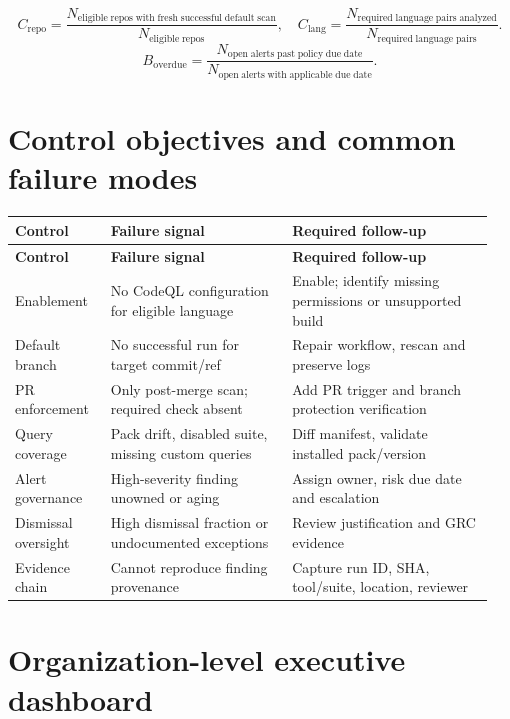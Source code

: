 \documentclass[11pt,letterpaper,oneside]{book}
\begin{document}
\[
C_{\mathrm{repo}}=\frac{N_{\mathrm{eligible\;repos\;with\;fresh\;successful\;default\;scan}}}{N_{\mathrm{eligible\;repos}}},\quad
C_{\mathrm{lang}}=\frac{N_{\mathrm{required\;language\;pairs\;analyzed}}}{N_{\mathrm{required\;language\;pairs}}}.
\]
\[
B_{\mathrm{overdue}}=\frac{N_{\mathrm{open\;alerts\;past\;policy\;due\;date}}}{N_{\mathrm{open\;alerts\;with\;applicable\;due\;date}}}.
\]

\section{Control objectives and common failure modes}

\small
\setlength{\tabcolsep}{2pt}
\renewcommand{\arraystretch}{1.18}
\begin{longtable}{>{\raggedright\arraybackslash}p{0.19\linewidth}>{\raggedright\arraybackslash}p{0.36\linewidth}>{\raggedright\arraybackslash}p{0.4\linewidth}}
\toprule
\textbf{Control} & \textbf{Failure signal} & \textbf{Required follow-up}\\
\midrule
\endfirsthead
\toprule
\textbf{Control} & \textbf{Failure signal} & \textbf{Required follow-up}\\
\midrule
\endhead
Enablement & No CodeQL configuration for eligible language & Enable; identify missing permissions or unsupported build\\
Default branch & No successful run for target commit/ref & Repair workflow, rescan and preserve logs\\
PR enforcement & Only post-merge scan; required check absent & Add PR trigger and branch protection verification\\
Query coverage & Pack drift, disabled suite, missing custom queries & Diff manifest, validate installed pack/version\\
Alert governance & High-severity finding unowned or aging & Assign owner, risk due date and escalation\\
Dismissal oversight & High dismissal fraction or undocumented exceptions & Review justification and GRC evidence\\
Evidence chain & Cannot reproduce finding provenance & Capture run ID, SHA, tool/suite, location, reviewer\\
\bottomrule
\end{longtable}
\normalsize

\section{Organization-level executive dashboard}
\end{document}
